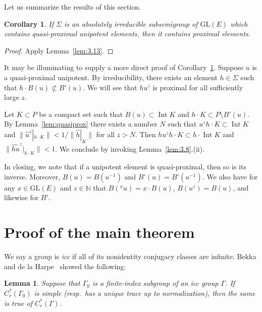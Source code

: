 \documentclass{amsart}
\theoremstyle{plain}
\newtheorem{lemma}[theorem]{Lemma}
\newtheorem{corollary}[theorem]{Corollary}
\theoremstyle{definition}
\theoremstyle{remark}
\DeclareMathOperator{\Int}{Int}
\providecommand{\norm}[1]{\lVert#1\rVert}
\begin{document}
Let us summarize the results of this section.
\begin{corollary}\label{cor:qpu}
If $\Sigma$ is an absolutely irreducible subsemigroup of $\mathrm{GL}(E)$ which contains
quasi-proximal unipotent elements, then it contains proximal elements.
\end{corollary}
\begin{proof}
Apply Lemma~\ref{lem:3.13}.
\end{proof}

It may be illuminating to supply a more direct proof of Corollary~\ref{cor:qpu}.
Suppose $u$ is a quasi-proximal unipotent. By irreducibility, there exists an element $h
\in \Sigma$ such that $h\cdot B(u) \not\subset B'(u)$. We will see that $hu^{z}$ is
proximal for all sufficiently large $z$.

Let $K \subset P$ be a compact set such that $B(u) \subset \Int K$ and
$h\cdot K \subset P\setminus B'(u)$. By Lemma~\ref{lem:quasiprox} there exists a number  
$N$ such that $u^{z}h\cdot K \subset \Int K$ and $\norm{
\widehat{u}^{z}|_{h\cdot K}} < 1/\norm{
\widehat{h}|_{K}}$ for all $z > N$. Then
$hu^{z}h\cdot K \subset h\cdot\Int K$ and $\norm{
\widehat{hu}^{z}|_{h\cdot K}} < 1$. We conclude by invoking Lemma~\ref{lem:3.8}.(ii).

In closing, we note that if a unipotent element is quasi-proximal, then so is its inverse.
Moreover, $B(u) = B(u^{-1})$ and $B'(u) = B'(u^{-1})$. We also have for any $x \in
\mathrm{GL}(E)$ and $z \in \mathbb{N}$ that $B(\mbox{}^{x}u) = x\cdot B(u)$,
$B(u^{z}) = B(u)$, and likewise for $B'$.

\section{Proof of the main theorem}\label{sec:proof}
We say a group is \emph{icc} if all of its nonidentity conjugacy classes are infinite.
Bekka and de la Harpe~\cite{MR2001j:46078} showed the following:
\begin{lemma}\label{lem:goingUp}
Suppose that $\Gamma_{0}$ 
is a finite-index subgroup of an icc group $\Gamma$. If $C_{r}^{*}(\Gamma_{0})$ is simple
(resp.\ has a unique trace up to normalization), then the same is true of $C_{r}^{*}(\Gamma)$.
\end{lemma}
\end{document}
